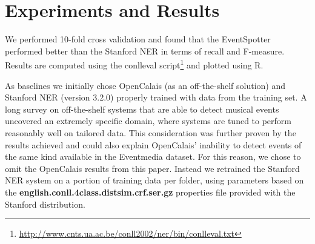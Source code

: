 \documentclass[10pt,a4paper]{article}
\begin{document}
{\section{Experiments and Results}
We performed 10-fold cross validation and found that the EventSpotter performed better than the Stanford NER in terms of recall and F-measure. Results are computed using the conlleval script\footnote{\url{http://www.cnts.ua.ac.be/conll2002/ner/bin/conlleval.txt}} and plotted using R.

As baselines we initially chose OpenCalais (as an off-the-shelf solution) and Stanford NER (version 3.2.0) properly trained with data from the training set. 
A long survey on off-the-shelf systems that are able to detect musical events uncovered an extremely specific domain, where systems are tuned to perform reasonably well on tailored data. This consideration was further proven by the results achieved and could also explain OpenCalais' inability to detect events of the same kind available in the Eventmedia dataset. For this reason, we chose to omit the OpenCalais results from this paper.
Instead we retrained the Stanford NER system on a portion of training data per folder, using parameters based on the \textbf{english.conll.4class.distsim.crf.ser.gz} properties file provided with the Stanford distribution.

}
\end{document}
